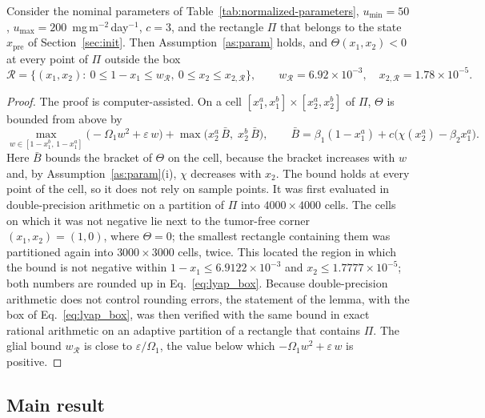 \begin{lemma}
\label{lem:theta}
Consider the nominal parameters of Table~\ref{tab:normalized-parameters}, $u_{\min}=50$, $u_{\max}=200$~mg\,m$^{-2}$\,day$^{-1}$, $c=3$, and the rectangle $\Pi$ that belongs to the state $x_{\mathrm{pre}}$ of Section~\ref{sec:init}. Then Assumption~\ref{as:param} holds, and $\Theta(x_1,x_2)<0$ at every point of $\Pi$ outside the box
\begin{equation}
\mathcal R=\bigl\{(x_1,x_2):\ 0\le1-x_1\le w_{\mathcal R},\ 0\le x_2\le x_{2,\mathcal R}\bigr\},\qquad
w_{\mathcal R}=6.92\times10^{-3},\quad x_{2,\mathcal R}=1.78\times10^{-5}.
\label{eq:lyap_box}
\end{equation}
\end{lemma}

\begin{proof}
The proof is computer-assisted. On a cell $[x_1^a,x_1^b]\times[x_2^a,x_2^b]$ of $\Pi$, $\Theta$ is bounded from above by
\[
\max_{w\in[1-x_1^b,\,1-x_1^a]}\bigl(-\Omega_1w^2+\varepsilon\,w\bigr)+\max\bigl(x_2^a\,\bar B,\;x_2^b\,\bar B\bigr),\qquad
\bar B=\beta_1(1-x_1^a)+c\bigl(\chi(x_2^a)-\beta_2x_1^a\bigr).
\]
Here $\bar B$ bounds the bracket of $\Theta$ on the cell, because the bracket increases with $w$ and, by Assumption~\ref{as:param}(i), $\chi$ decreases with $x_2$. The bound holds at every point of the cell, so it does not rely on sample points. It was first evaluated in double-precision arithmetic on a partition of $\Pi$ into $4000\times4000$ cells. The cells on which it was not negative lie next to the tumor-free corner $(x_1,x_2)=(1,0)$, where $\Theta=0$; the smallest rectangle containing them was partitioned again into $3000\times3000$ cells, twice. This located the region in which the bound is not negative within $1-x_1\le6.9122\times10^{-3}$ and $x_2\le1.7777\times10^{-5}$; both numbers are rounded up in Eq.~\eqref{eq:lyap_box}. Because double-precision arithmetic does not control rounding errors, the statement of the lemma, with the box of Eq.~\eqref{eq:lyap_box}, was then verified with the same bound in exact rational arithmetic on an adaptive partition of a rectangle that contains $\Pi$. The glial bound $w_{\mathcal R}$ is close to $\varepsilon/\Omega_1$, the value below which $-\Omega_1w^2+\varepsilon\,w$ is positive.
\end{proof}

\subsection{Main result}

